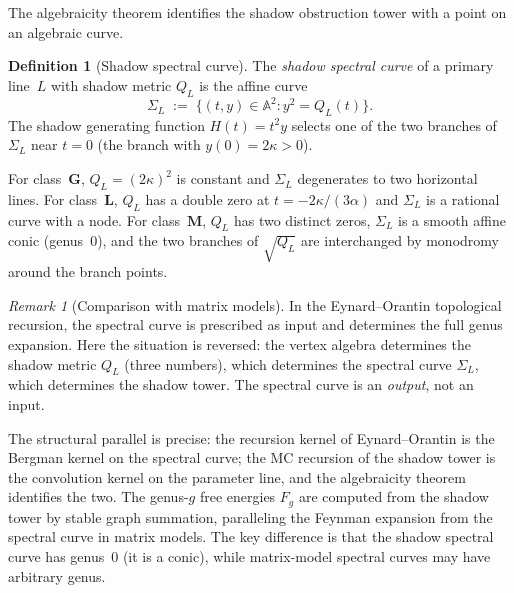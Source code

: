 \documentclass[11pt,reqno]{amsart}
\theoremstyle{definition}
\newtheorem{definition}[theorem]{Definition}
\theoremstyle{remark}
\newtheorem{remark}[theorem]{Remark}
\numberwithin{equation}{section}
\begin{document}
The algebraicity theorem identifies the shadow obstruction
tower with a point on an algebraic curve.

\begin{definition}[Shadow spectral
curve]\label{def:spectral-curve}
The \emph{shadow spectral curve} of a primary line~$L$
with shadow metric $Q_L$ is the affine curve
\begin{equation}\label{eq:spectral-curve}
 \Sigma_L
 \;:=\;
 \bigl\{(t, y) \in \mathbb{A}^2 : y^2 = Q_L(t)\bigr\}.
\end{equation}
The shadow generating function $H(t) = t^2 y$ selects one
of the two branches of~$\Sigma_L$ near $t = 0$ (the branch
with $y(0) = 2\kappa > 0$).
\end{definition}

For class~$\mathbf{G}$, $Q_L = (2\kappa)^2$ is constant and
$\Sigma_L$ degenerates to two horizontal lines. For
class~$\mathbf{L}$, $Q_L$ has a double zero at
$t = -2\kappa/(3\alpha)$ and $\Sigma_L$ is a rational curve
with a node. For class~$\mathbf{M}$, $Q_L$ has two distinct
zeros, $\Sigma_L$ is a smooth affine conic (genus~$0$), and
the two branches of $\sqrt{Q_L}$ are interchanged by
monodromy around the branch points.

\begin{remark}[Comparison with matrix
models]\label{rem:matrix-models}
In the Eynard--Orantin topological recursion, the spectral
curve is prescribed as input and determines the full
genus expansion. Here the situation is reversed: the vertex
algebra determines the shadow metric $Q_L$ (three numbers),
which determines the spectral curve $\Sigma_L$, which
determines the shadow tower. The spectral curve is an
\emph{output}, not an input.

The structural parallel is precise: the recursion kernel of
Eynard--Orantin is the Bergman kernel on the spectral
curve; the MC recursion of the shadow tower is the
convolution kernel on the parameter line, and the
algebraicity theorem identifies the two. The genus-$g$
free energies $F_g$ are computed from the shadow tower by
stable graph summation, paralleling the Feynman expansion
from the spectral curve in matrix models. The key
difference is that the shadow spectral curve has genus~$0$
(it is a conic), while matrix-model spectral curves may
have arbitrary genus.
\end{remark}


\end{document}
